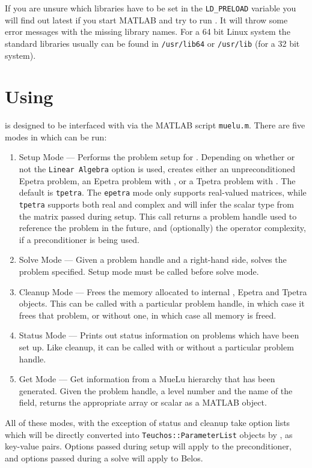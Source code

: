 If you are unsure which libraries have to be set in the \texttt{LD\_PRELOAD} variable you will find out latest if you start MATLAB and try to run \muemex. It will throw some error messages with the missing library names. For a 64 bit Linux system the standard libraries usually can be found in \texttt{/usr/lib64} or \texttt{/usr/lib} (for a 32 bit system).

\section{Using \muemex}\label{sec:muemex:usage}
\muemex is designed to be interfaced with via the MATLAB script
\texttt{muelu.m}.  There are five modes in which \muemex can be run:
\begin{enumerate}
\item Setup Mode --- Performs the problem setup for \muelu.
  Depending on whether or not the \texttt{Linear Algebra} option is
  used, \muemex creates either an unpreconditioned Epetra problem,
  an Epetra problem with \muelu, or a Tpetra problem with \muelu.
  The default is \texttt{tpetra}. The \texttt{epetra} mode only supports
  real-valued matrices, while \texttt{tpetra}
  supports both real and complex and will infer the scalar type
  from the matrix passed during setup.  This call returns a problem
  handle used to reference the problem in the future, and (optionally)
  the operator complexity, if a preconditioner is being used.
\item Solve Mode --- Given a problem handle and a right-hand side, \muemex
  solves the problem specified.  Setup mode must be called before
  solve mode.
\item Cleanup Mode --- Frees the memory allocated to internal \muelu,
  Epetra and Tpetra objects.  This can be called with a particular
  problem handle, in which case it frees that problem, or without one,
  in which case all \muemex memory is freed.
\item Status Mode --- Prints out status information on problems which
  have been set up.  Like cleanup, it can be called with or without a
  particular problem handle.
\item Get Mode --- Get information from a MueLu hierarchy that has been
  generated. Given the problem handle, a level number and the name of the
  field, returns the appropriate array or scalar as a MATLAB object.
\end{enumerate}
All of these modes, with the exception of status and cleanup take
option lists which will be directly converted into
\texttt{Teuchos::ParameterList} objects by \muemex, as key-value pairs.
Options passed during setup will apply to the \muelu preconditioner, and
options passed during a solve will apply to Belos.

